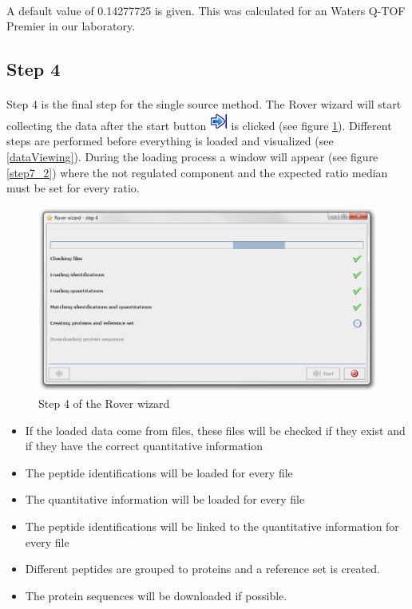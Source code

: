 \documentclass[11pt,a4paper,oneside,notitlepage]{book}
\begin{document}
\paragraph{}A default value of 0.14277725 is given. This was calculated for an Waters Q-TOF Premier in our laboratory.

\subsection{Step 4}
\paragraph{}Step 4 is the final step for the single source method. The Rover wizard will start collecting the data after the start button \includegraphics[scale=0.6, H]{finish.png} is clicked (see figure \ref{step4}). Different steps are performed before everything is loaded and visualized (see \ref{dataViewing}). During the loading process a window will appear (see figure \ref{step7_2}) where the  not regulated component and the expected ratio median must be set for every ratio. 

\begin{figure}[H]
\begin{center}
\includegraphics[scale=0.4]{Rover_wizard_-_step_4_S.png}
\caption{Step 4 of the Rover wizard}
\label{step4}
\end{center}
\end{figure}

\begin{itemize}
\item If the loaded data come from files, these files will be checked if they exist and if they have the correct quantitative information
\item The peptide identifications will be loaded for every file
\item The quantitative information will be loaded for every file
\item The peptide identifications will be linked to the quantitative information for every file
\item Different peptides are grouped to proteins and a reference set is created. 
\item The protein sequences will be downloaded if possible.
\end{itemize}
\end{document}
